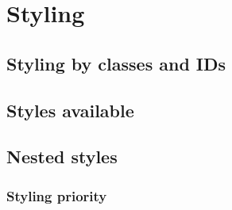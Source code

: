 \chapter{Styling}

\section{Styling by classes and IDs}

\section{Styles available}

\section{Nested styles}

\subsection{Styling priority}
